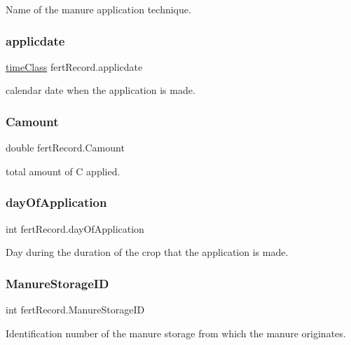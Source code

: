 Name of the manure application technique. \mbox{\label{classfert_record_abb3dcc8fe64aef946d15be6992bc0622}} 
\subsubsection{\texorpdfstring{applicdate}{applicdate}}
{\footnotesize\ttfamily \mbox{\hyperlink{classtime_class}{time\+Class}} fert\+Record.\+applicdate}

calendar date when the application is made. \mbox{\label{classfert_record_a7f27f6a12e169928db44a8bb073dca7d}} 
\subsubsection{\texorpdfstring{Camount}{Camount}}
{\footnotesize\ttfamily double fert\+Record.\+Camount}

total amount of C applied. \mbox{\label{classfert_record_a999d28e9fac11717726d469ffefe0292}} 
\subsubsection{\texorpdfstring{dayOfApplication}{dayOfApplication}}
{\footnotesize\ttfamily int fert\+Record.\+day\+Of\+Application}

Day during the duration of the crop that the application is made. \mbox{\label{classfert_record_a91e455f4ce8924187f4351359f1c0be7}} 
\subsubsection{\texorpdfstring{ManureStorageID}{ManureStorageID}}
{\footnotesize\ttfamily int fert\+Record.\+Manure\+Storage\+ID}

Identification number of the manure storage from which the manure originates. \mbox{\label{classfert_record_aa387b8011b0ad697b1d8ab0ee821a425}} 
